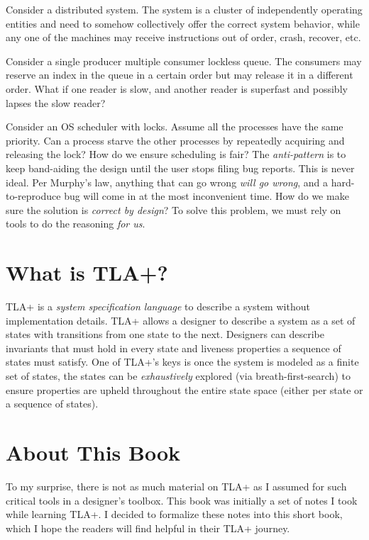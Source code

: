 Consider a distributed system. The system is a cluster of independently operating
entities and need to somehow collectively offer the correct system behavior,
while any one of the machines may receive instructions out of order, crash,
recover, etc. \newline

Consider a single producer multiple consumer lockless queue. The consumers may
reserve an index in the queue in a certain order but may release it in a
different order. What if one reader is slow, and another reader is superfast
and possibly lapses the slow reader? \newline

Consider an OS scheduler with locks. Assume all the processes have the
same priority. Can a process starve the other processes by repeatedly acquiring
and releasing the lock? How do we ensure scheduling is fair?\newline
The \textit{anti-pattern} is to keep band-aiding the design until the user
stops filing bug reports. This is never ideal. Per Murphy's law, anything that
can go wrong \textit{will go wrong}, and a hard-to-reproduce bug will come in at
the most inconvenient time. How do we make sure the solution is \textit{correct
by design}? To solve this problem, we must rely on tools to do the
reasoning \textit{for us}.

\section{What is TLA+?}

TLA+ is a \textit{system specification language} to describe a system
without implementation details. TLA+ allows a designer to describe a system as a
set of states with transitions from one state to the next. Designers can
describe invariants that must hold in every state and liveness properties a
sequence of states must satisfy. One of TLA+'s keys is once the system is modeled
as a finite set of states, the states can be \textit{exhaustively} explored
(via breath-first-search) to ensure properties are upheld throughout the entire
state space (either per state or a sequence of states).

\section{About This Book}
To my surprise, there is not as much material on TLA+ as I assumed for
such critical tools in a designer's toolbox. This book was initially a set of
notes I took while learning TLA+. I decided to formalize these notes into this
short book, which I hope the readers will find helpful in their TLA+
journey.\newline

